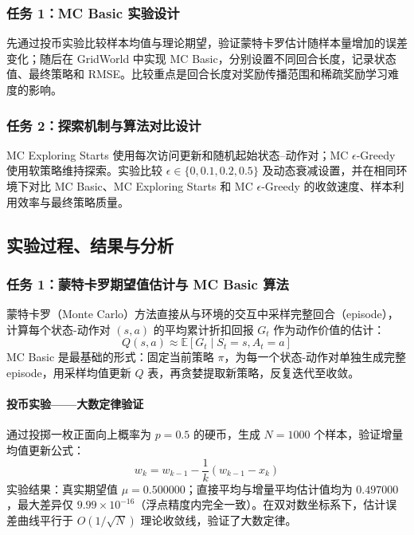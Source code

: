 \documentclass[11pt,a4paper,UTF8]{ctexart}
\numberwithin{figure}{section}
\numberwithin{table}{section}
\begin{document}
\subsubsection{任务 1：MC Basic 实验设计}

先通过投币实验比较样本均值与理论期望，验证蒙特卡罗估计随样本量增加的误差变化；随后在 GridWorld 中实现 MC Basic，分别设置不同回合长度，记录状态值、最终策略和 RMSE。比较重点是回合长度对奖励传播范围和稀疏奖励学习难度的影响。

\subsubsection{任务 2：探索机制与算法对比设计}

MC Exploring Starts 使用每次访问更新和随机起始状态--动作对；MC $\epsilon$-Greedy 使用软策略维持探索。实验比较 $\epsilon\in\{0,0.1,0.2,0.5\}$ 及动态衰减设置，并在相同环境下对比 MC Basic、MC Exploring Starts 和 MC $\epsilon$-Greedy 的收敛速度、样本利用效率与最终策略质量。




\subsection{实验过程、结果与分析}

\subsubsection{任务 1：蒙特卡罗期望值估计与 MC Basic 算法}

蒙特卡罗（Monte Carlo）方法直接从与环境的交互中采样完整回合（episode），计算每个状态-动作对 $(s,a)$ 的平均累计折扣回报 $G_t$ 作为动作价值的估计：
$$Q(s,a) \approx \mathbb{E}[G_t \mid S_t=s, A_t=a]$$
MC Basic 是最基础的形式：固定当前策略 $\pi$，为每一个状态-动作对单独生成完整 episode，用采样均值更新 $Q$ 表，再贪婪提取新策略，反复迭代至收敛。

\paragraph{投币实验——大数定律验证}

通过投掷一枚正面向上概率为 $p=0.5$ 的硬币，生成 $N=1000$ 个样本，验证增量均值更新公式：
$$w_{k} = w_{k-1} - \frac{1}{k}(w_{k-1} - x_k)$$
实验结果：真实期望值 $\mu = 0.500000$；直接平均与增量平均估计值均为 $0.497000$，最大差异仅 $9.99 \times 10^{-16}$（浮点精度内完全一致）。在双对数坐标系下，估计误差曲线平行于 $O(1/\sqrt{N})$ 理论收敛线，验证了大数定律。
\end{document}

